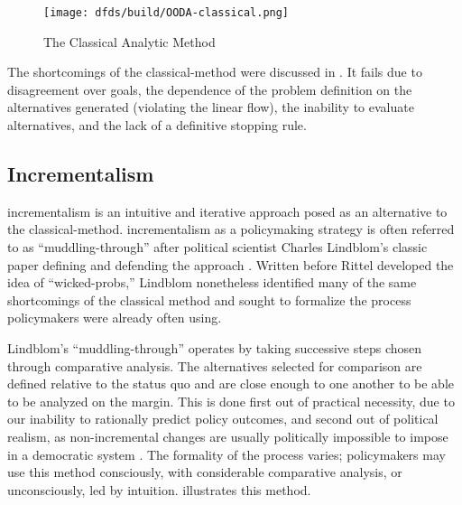 \begin{figure}[h]
  \centering\CaptionFontSize
  \texttt{[image: dfds/build/OODA-classical.png]}
  \caption[The Classical Analytic Method]{The Classical Analytic Method}
  \label{fig-classical-method}
\end{figure}

The shortcomings of the \ac{classical-method} were discussed in . It fails due to
disagreement over goals, the dependence of the problem definition on the alternatives generated (violating the linear
flow), the inability to evaluate alternatives, and the lack of a definitive stopping rule.

\subsection{Incrementalism}

\Ac{incrementalism} is an intuitive and iterative approach posed as an alternative to the \ac{classical-method}.
\Ac{incrementalism} as a policymaking strategy is often referred to as ``\ac{muddling-through}'' after political
scientist Charles Lindblom's classic paper defining and defending the approach \cite{lindblom_muddling_1959}. Written
before Rittel developed the idea of ``\acp{wicked-prob},'' Lindblom nonetheless identified many of the same shortcomings
of the classical method and sought to formalize the process policymakers were already often using.

Lindblom's ``\ac{muddling-through}'' operates by taking successive steps chosen through comparative analysis. The
alternatives selected for comparison are defined relative to the status quo and are close enough to one another to be
able to be analyzed on the margin. This is done first out of practical necessity, due to our inability to rationally
predict policy outcomes, and second out of political realism, as non-incremental changes are usually politically
impossible to impose in a democratic system \cite{lindblom_muddling_1959}. The formality of the process varies;
policymakers may use this method consciously, with considerable comparative analysis, or unconsciously, led by
intuition.  illustrates this method.


